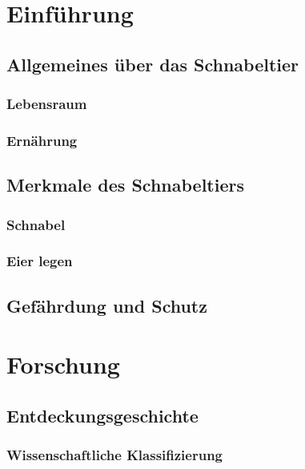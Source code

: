 \documentclass{article}
\begin{document}
\part{Einführung}
	\chapter{Allgemeines über das Schnabeltier}

		\section{Lebensraum}


		\section{Ernährung}



	\chapter{Merkmale des Schnabeltiers}

		\section{Schnabel}

			\begin{algorithm}

			\end{algorithm}



		\section{Eier legen}



	\chapter{Gefährdung und Schutz}



\part{Forschung}
	\chapter{Entdeckungsgeschichte}

		\section{Wissenschaftliche Klassifizierung}
\end{document}

